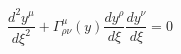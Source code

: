 \begin{equation}
\frac{d^2y^\mu}{d\xi^2}
+\Gamma^\mu_{\rho\nu}(y)\frac{dy^\rho}{d\xi}\frac{dy^\nu}{d\xi}=0
\end{equation}

